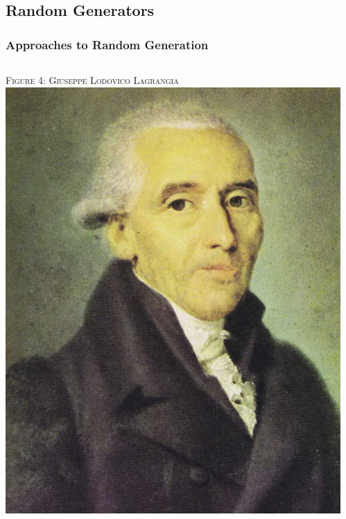 \documentclass{beamer}
\begin{document}
\subsection{Random Generators}
\begin{frame}
\frametitle{Approaches to Random Generation}
\vspace{-1 em}

\begin{columns}
\begin{column}{0.5\textwidth}
{\tiny \textsc{Figure 4: Giuseppe Lodovico Lagrangia}}\\
\vspace{0.5 em}
\includegraphics[scale = 0.25]{images/lag.jpg}
\end{column}
\begin{column}{0.65\textwidth}


\end{column}
\end{columns}
\end{frame}
\end{document}

